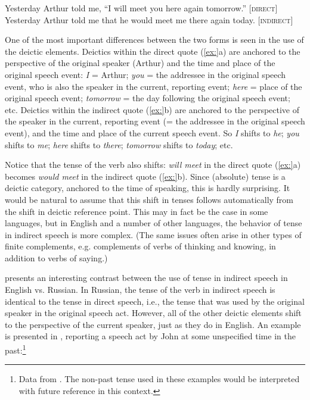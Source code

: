 \ea
\ea Yesterday Arthur told me, “I will meet you here again tomorrow.”  [\textsc{direct}]\\
\ex Yesterday Arthur told me that he would meet me there again today.  [\textsc{indirect}]
                       \z
\z


One of the most important differences between the two forms is seen in the use of the deictic elements. Deictics within the direct quote (\ref{ex:}a) are anchored to the perspective of the original speaker (Arthur) and the time and place of the original speech event: \textit{I} = Arthur; \textit{you} = the addressee in the original speech event, who is also the speaker in the current, reporting event; \textit{here} = place of the original speech event; \textit{tomorrow} = the day following the original speech event; etc. Deictics within the indirect quote (\ref{ex:}b) are anchored to the perspective of the speaker in the current, reporting event (= the addressee in the original speech event), and the time and place of the current speech event. So \textit{I} shifts to \textit{he}; \textit{you} shifts to \textit{me}; \textit{here} shifts to \textit{there}; \textit{tomorrow} shifts to \textit{today}; etc.



Notice that the tense of the verb also shifts: \textit{will meet} in the direct quote (\ref{ex:}a) becomes \textit{would meet} in the indirect quote (\ref{ex:}b). Since (absolute) tense is a deictic category, anchored to the time of speaking, this is hardly surprising. It would be natural to assume that this shift in tenses follows automatically from the shift in deictic reference point. This may in fact be the case in some languages, but in English and a number of other languages, the behavior of tense in indirect speech is more complex. (The same issues often arise in other types of finite complements, e.g. complements of verbs of thinking and knowing, in addition to verbs of saying.)



\citet{Comrie1985} presents an interesting contrast between the use of tense in indirect speech in English vs. Russian. In Russian, the tense of the verb in indirect speech is identical to the tense in direct speech, i.e., the tense that was used by the original speaker in the original speech act. However, all of the other deictic elements shift to the perspective of the current speaker, just as they do in English. An example is presented in , reporting a speech act by John at some unspecified time in the past:\footnote{Data from \citet[109]{Comrie1985}. The non-past tense used in these examples would be interpreted with future reference in this context.}


